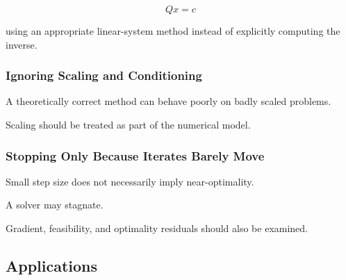 \[
Qx=c
\]

using an appropriate linear-system method instead of explicitly computing
the inverse.

\subsubsection{Ignoring Scaling and Conditioning}

A theoretically correct method can behave poorly on badly scaled
problems.

Scaling should be treated as part of the numerical model.

\subsubsection{Stopping Only Because Iterates Barely Move}

Small step size does not necessarily imply near-optimality.

A solver may stagnate.

Gradient, feasibility, and optimality residuals should also be examined.

\subsection{Applications}
\label{subsec:optimization-fundamentals-applications}

